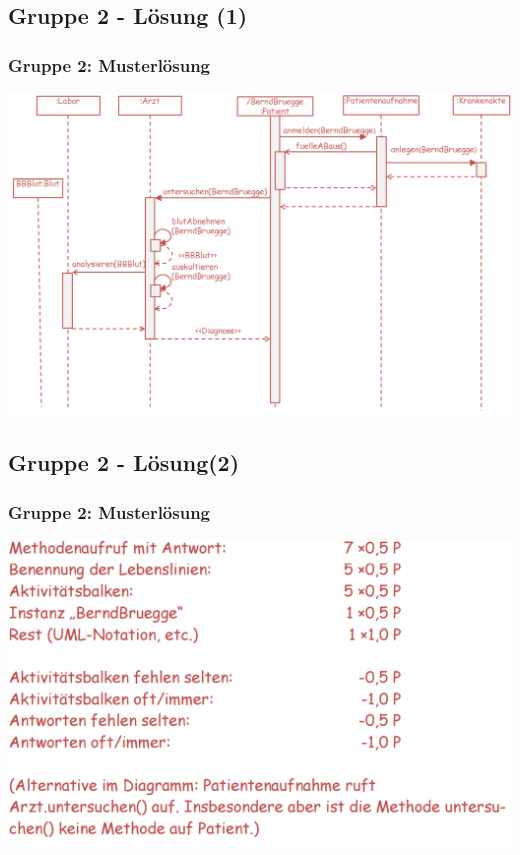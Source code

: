\documentclass[18pt]{beamer}
\begin{document}
	\subsection{Gruppe 2 - Lösung (1)}
	\begin{frame}
		\frametitle{Gruppe 2: Musterlösung}
		\includegraphics[scale=0.4]{./pics/tut2/group2sol1.png}
	\end{frame}

	\subsection{Gruppe 2 - Lösung(2)}
	\begin{frame}
		\frametitle{Gruppe 2: Musterlösung}
		\includegraphics[scale=0.4]{./pics/tut2/group2sol2.png}
	\end{frame}
\end{document}
